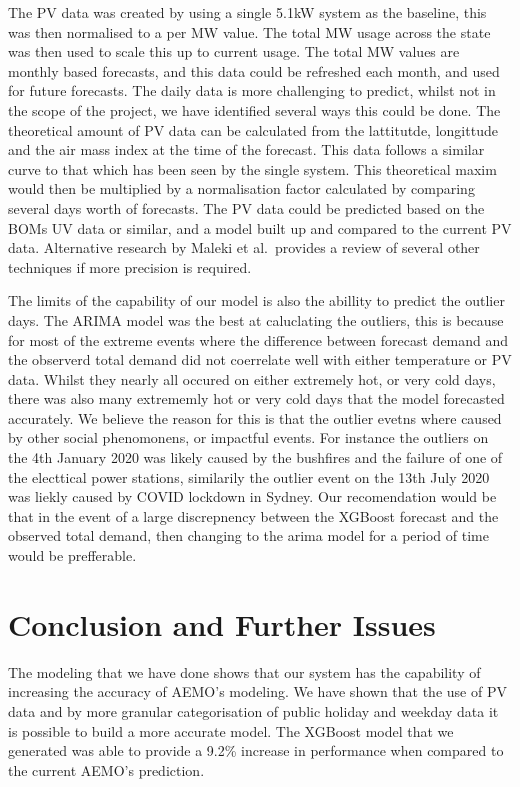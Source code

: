 \documentclass[mstat,12pt]{unswthesis}
\begin{document}
The PV data was created by using a single 5.1kW system as the baseline,
this was then normalised to a per MW value. The total MW usage across
the state was then used to scale this up to current usage. The total MW
values are monthly based forecasts, and this data could be refreshed
each month, and used for future forecasts. The daily data is more
challenging to predict, whilst not in the scope of the project, we have
identified several ways this could be done. The theoretical amount of PV
data can be calculated from the lattitutde, longittude and the air mass
index at the time of the forecast. This data follows a similar curve to
that which has been seen by the single system. This theoretical maxim
would then be multiplied by a normalisation factor calculated by
comparing several days worth of forecasts. The PV data could be
predicted based on the BOMs UV data or similar, and a model built up and
compared to the current PV data. Alternative research by Maleki et
al.~provides a review of several other techniques if more precision is
required\cite{en10010134}.

The limits of the capability of our model is also the abillity to
predict the outlier days. The ARIMA model was the best at caluclating
the outliers, this is because for most of the extreme events where the
difference between forecast demand and the observerd total demand did
not coerrelate well with either temperature or PV data. Whilst they
nearly all occured on either extremely hot, or very cold days, there was
also many extrememly hot or very cold days that the model forecasted
accurately. We believe the reason for this is that the outlier evetns
where caused by other social phenomonens, or impactful events. For
instance the outliers on the 4th January 2020 was likely caused by the
bushfires and the failure of one of the electtical power stations,
similarily the outlier event on the 13th July 2020 was liekly caused by
COVID lockdown in Sydney. Our recomendation would be that in the event
of a large discrepnency between the XGBoost forecast and the observed
total demand, then changing to the arima model for a period of time
would be prefferable.

\hypertarget{conclusion-and-further-issues}{%
\chapter{Conclusion and Further
Issues}\label{conclusion-and-further-issues}}

The modeling that we have done shows that our system has the capability
of increasing the accuracy of AEMO's modeling. We have shown that the
use of PV data and by more granular categorisation of public holiday and
weekday data it is possible to build a more accurate model. The XGBoost
model that we generated was able to provide a 9.2\% increase in
performance when compared to the current AEMO's prediction.
\end{document}
